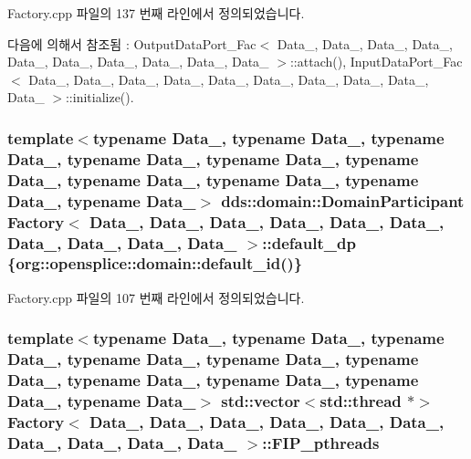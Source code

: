 Factory.\+cpp 파일의 137 번째 라인에서 정의되었습니다.



다음에 의해서 참조됨 \+:  Output\+Data\+Port\+\_\+\+Fac$<$ Data\+\_, Data\+\_, Data\+\_, Data\+\_, Data\+\_, Data\+\_, Data\+\_, Data\+\_, Data\+\_, Data\+\_ $>$\+::attach(), Input\+Data\+Port\+\_\+\+Fac$<$ Data\+\_, Data\+\_, Data\+\_, Data\+\_, Data\+\_, Data\+\_, Data\+\_, Data\+\_, Data\+\_, Data\+\_ $>$\+::initialize().

\subsubsection[{\texorpdfstring{default\+\_\+dp}{default_dp}}]{\setlength{\rightskip}{0pt plus 5cm}template$<$typename Data\+\_, typename Data\+\_, typename Data\+\_, typename Data\+\_, typename Data\+\_, typename Data\+\_, typename Data\+\_, typename Data\+\_, typename Data\+\_, typename Data\+\_$>$ dds\+::domain\+::\+Domain\+Participant {\bf Factory}$<$ Data\+\_, Data\+\_, Data\+\_, Data\+\_, Data\+\_, Data\+\_, Data\+\_, Data\+\_, Data\+\_, Data\+\_ $>$\+::default\+\_\+dp \{org\+::opensplice\+::domain\+::default\+\_\+id()\}}\hypertarget{classFactory_a7e8eac562d69cbed38ee27137c860498}{}\label{classFactory_a7e8eac562d69cbed38ee27137c860498}


Factory.\+cpp 파일의 107 번째 라인에서 정의되었습니다.

\subsubsection[{\texorpdfstring{F\+I\+P\+\_\+pthreads}{FIP_pthreads}}]{\setlength{\rightskip}{0pt plus 5cm}template$<$typename Data\+\_, typename Data\+\_, typename Data\+\_, typename Data\+\_, typename Data\+\_, typename Data\+\_, typename Data\+\_, typename Data\+\_, typename Data\+\_, typename Data\+\_$>$ std\+::vector$<$std\+::thread $\ast$$>$ {\bf Factory}$<$ Data\+\_, Data\+\_, Data\+\_, Data\+\_, Data\+\_, Data\+\_, Data\+\_, Data\+\_, Data\+\_, Data\+\_ $>$\+::F\+I\+P\+\_\+pthreads\hspace{0.3cm}{\ttfamily [private]}}\hypertarget{classFactory_a10eeb0e3620d248a5f500ab923e1bd4c}{}\label{classFactory_a10eeb0e3620d248a5f500ab923e1bd4c}


